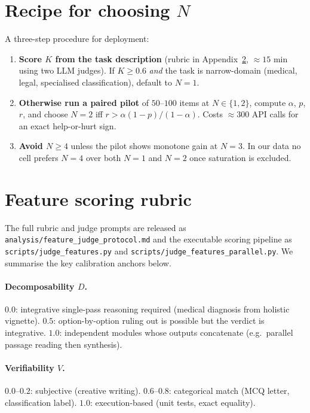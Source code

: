 \documentclass{article}
\begin{document}
\appendix

\section{Recipe for choosing $N$}
\label{app:recipe}

A three-step procedure for deployment:
\begin{enumerate}
\item \textbf{Score $K$ from the task description} (rubric in Appendix~\ref{app:rubric}, ${\approx}15$ min using two LLM judges). If $K \geq 0.6$ \emph{and} the task is narrow-domain (medical, legal, specialised classification), default to $N{=}1$.
\item \textbf{Otherwise run a paired pilot} of $50$--$100$ items at $N \in \{1, 2\}$, compute $\alpha$, $p$, $r$, and choose $N{=}2$ iff $r > \alpha(1{-}p)/(1{-}\alpha)$. Costs ${\approx}300$ API calls for an exact help-or-hurt sign.
\item \textbf{Avoid $N \geq 4$} unless the pilot shows monotone gain at $N{=}3$. In our data no cell prefers $N{=}4$ over both $N{=}1$ and $N{=}2$ once saturation is excluded.
\end{enumerate}


\section{Feature scoring rubric}
\label{app:rubric}

The full rubric and judge prompts are released as
\texttt{analysis/feature\_judge\_protocol.md} and the executable scoring
pipeline as \texttt{scripts/judge\_features.py} and
\texttt{scripts/judge\_features\_parallel.py}. We summarise the key
calibration anchors below.

\paragraph{Decomposability $D$.} $0.0$: integrative single-pass reasoning
required (medical diagnosis from holistic vignette). $0.5$: option-by-option
ruling out is possible but the verdict is integrative. $1.0$: independent
modules whose outputs concatenate (e.g.\ parallel passage reading then
synthesis).

\paragraph{Verifiability $V$.} $0.0$--$0.2$: subjective (creative writing).
$0.6$--$0.8$: categorical match (MCQ letter, classification label).
$1.0$: execution-based (unit tests, exact equality).
\end{document}
